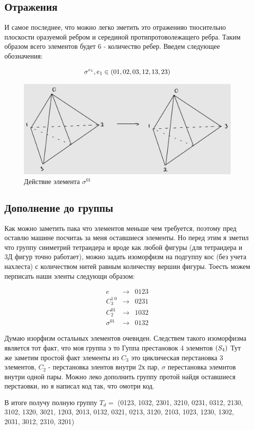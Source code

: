 \subsection{Отражения}

И самое последнее, что можно легко зметить это отраженияо тносительно плоскости 
оразуемой ребром и серединой протипротоволежащего ребра. Таким образом всего 
элементов будет $6$ - количество ребер. Введем следующее обозначения:

\begin{equation}
    \sigma^{e_1}, e_1 \in \left( 01, 02, 03, 12, 13, 23 \right)
\end{equation}

\begin{figure}[H]
    \centering
    \includegraphics[width=0.5\linewidth]{su/sigma_01.jpg}
    \caption{Действие элемента $\sigma^{01}$}
\end{figure}

\subsection{Дополнение до группы}
Как можно заметить пака что элементов меньше чем требуется, поэтому пред оставлю 
машине посчитаь за меня оставшиеся элементы. Но перед этим я зметил что
группу сииметрий тетраидера и вроде как любой фигуры (для тетраидера и 3Д 
фигур точно работает), можно задать изоморфизм на подгуппу кос (без учета 
нахлеста) с количеством нитей равным количеству вершин фигуры. 
Тоесть можем перписать наши эленты следующи образом:

\begin{eqnarray}
    e &\to &0123\\
    C_3^{1 \ 0} &\to & 0231 \\
    C_2^{01} &\to & 1032\\
    \sigma^{01} &\to & 0132
\end{eqnarray}

Думаю изорфизм остальных элементов очевиден. Следствем такого изоморфизма 
является тот факт, что моя группа э то Гуппа престановок 4 элемнтов $\left( S_4 \right)$
Тут же заметим простой факт элементы из $C_3$ это циклическая перстановка 3 элементов, $C_2$ - перстановка 
элентов внутри 2х пар, $\sigma$ перестановка элемнтов внутри одной пары. 
Можно леко дополнить группу протой найдя оставшиеся перстаовки,
но я написал код так, что омотри код.

В итоге получу полную группу $T_d=$ (0123, 1032, 2301, 3210, 0231, 
0312, 2130, 3102, 1320, 3021, 1203, 2013, 0132, 0321, 0213, 3120, 2103, 
1023, 1230, 1302, 2031, 3012, 2310, 3201)

